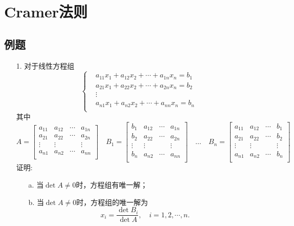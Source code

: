 \section{Cramer法则}
\subsection*{例题}
\begin{itemize}
	\item[1.] 对于线性方程组
	\begin{equation*}
	\left\{
	\begin{aligned}
	&a_{11} x_1 + a_{12} x_2 + \cdots + a_{1n}x_n = b_1\\
	&a_{21} x_1 + a_{22} x_2 + \cdots + a_{2n}x_n = b_2\\
	&\vdots\\
	&a_{n1} x_1 + a_{n2} x_2 + \cdots + a_{nn}x_n = b_n\\
	\end{aligned}
	\right.
	\end{equation*}
	其中
	\begin{equation*}
	A = \begin{bmatrix}
		a_{11} &a_{12} &\cdots & a_{1n}\\
		a_{21} &a_{22} &\cdots & a_{2n}\\
		\vdots & \vdots&       & \vdots\\
		a_{n1} &a_{n2} &\cdots & a_{nn}\\
	\end{bmatrix}
	\quad
	B_1 = 
	\begin{bmatrix}
		b_{1} &a_{12} &\cdots & a_{1n}\\
		b_{2} &a_{22} &\cdots & a_{2n}\\
		\vdots & \vdots&       & \vdots\\
		b_{n} &a_{n2} &\cdots & a_{nn}\\
	\end{bmatrix}
	\quad
	\dots
	\quad
	B_n = 
	\begin{bmatrix}
		a_{11} &a_{12} &\cdots & b_{1}\\
		a_{21} &a_{22} &\cdots & b_{2}\\
		\vdots & \vdots&       & \vdots\\
		a_{n1} &a_{n2} &\cdots & b_{n}\\
	\end{bmatrix}
	\end{equation*}
	证明:
	\begin{enumerate}
		\item[a.] 当$\det A \ne 0$时，方程组有唯一解；
		\item[b.] 当$\det A \ne 0$时，方程组的唯一解为
		$$x_i = \frac{\det B_i}{\det A}, \quad i= 1, 2, \cdots, n.$$
	\end{enumerate}
	\vspace{4cm}
\end{itemize}

